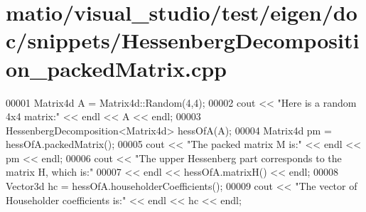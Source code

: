 \hypertarget{matio_2visual__studio_2test_2eigen_2doc_2snippets_2_hessenberg_decomposition__packed_matrix_8cpp_source}{}\section{matio/visual\+\_\+studio/test/eigen/doc/snippets/\+Hessenberg\+Decomposition\+\_\+packed\+Matrix.cpp}
\label{matio_2visual__studio_2test_2eigen_2doc_2snippets_2_hessenberg_decomposition__packed_matrix_8cpp_source}

\begin{DoxyCode}
00001 Matrix4d A = Matrix4d::Random(4,4);
00002 cout << \textcolor{stringliteral}{"Here is a random 4x4 matrix:"} << endl << A << endl;
00003 HessenbergDecomposition<Matrix4d> hessOfA(A);
00004 Matrix4d pm = hessOfA.packedMatrix();
00005 cout << \textcolor{stringliteral}{"The packed matrix M is:"} << endl << pm << endl;
00006 cout << \textcolor{stringliteral}{"The upper Hessenberg part corresponds to the matrix H, which is:"} 
00007      << endl << hessOfA.matrixH() << endl;
00008 Vector3d hc = hessOfA.householderCoefficients();
00009 cout << \textcolor{stringliteral}{"The vector of Householder coefficients is:"} << endl << hc << endl;
\end{DoxyCode}
